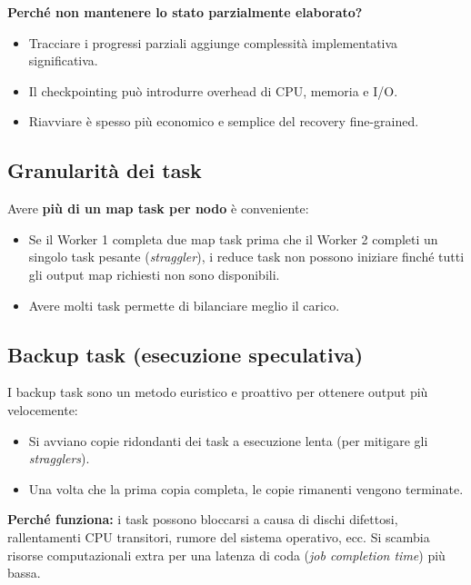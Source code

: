 \textbf{Perché non mantenere lo stato parzialmente elaborato?}
\begin{itemize}
  \item Tracciare i progressi parziali aggiunge complessità implementativa
    significativa.
  \item Il checkpointing può introdurre overhead di CPU, memoria e I/O.
  \item Riavviare è spesso più economico e semplice del recovery fine-grained.
\end{itemize}

\subsection{Granularità dei task}

Avere \textbf{più di un map task per nodo} è conveniente:
\begin{itemize}
  \item Se il Worker 1 completa due map task prima che il Worker 2
    completi un singolo task pesante (\emph{straggler}), i reduce task
    non possono iniziare finché tutti gli output map richiesti non sono
    disponibili.
  \item Avere molti task permette di bilanciare meglio il carico.
\end{itemize}

\subsection{Backup task (esecuzione speculativa)}

\begin{definizione}
  I backup task sono un metodo euristico e proattivo per ottenere output
  più velocemente:
  \begin{itemize}
    \item Si avviano copie ridondanti dei task a esecuzione lenta
      (per mitigare gli \emph{stragglers}).
    \item Una volta che la prima copia completa, le copie rimanenti
      vengono terminate.
  \end{itemize}
\end{definizione}

\textbf{Perché funziona:} i task possono bloccarsi a causa di dischi difettosi,
rallentamenti CPU transitori, rumore del sistema operativo, ecc. Si scambia
risorse computazionali extra per una latenza di coda (\emph{job completion time})
più bassa.

